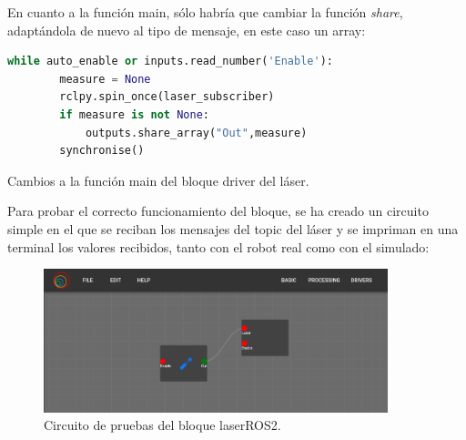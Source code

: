 \newpage

En cuanto a la función main, sólo habría que cambiar la función \textit{share}, adaptándola de nuevo al tipo de mensaje, en este caso un array:
\begin{code}[H]
  \begin{lstlisting}[language=python]
    while auto_enable or inputs.read_number('Enable'):
        measure = None
        rclpy.spin_once(laser_subscriber)
        if measure is not None:
            outputs.share_array("Out",measure)   
        synchronise()  
  \end{lstlisting}
  \caption[Cambios main bloque láser]{Cambios a la función main del bloque driver del láser.}
  \label{cod:laser_main_changes}
\end{code}

Para probar el correcto funcionamiento del bloque, se ha creado un circuito simple en el que se reciban los mensajes del topic del láser y se impriman
en una terminal los valores recibidos, tanto con el robot real como con el simulado:

\begin{figure} [H]
  \begin{center}
      \includegraphics[width=10cm]{figs/c4/laserC.png}
  \end{center}
  \caption[Circuito pruebas bloque láser ROS2]{Circuito de pruebas del bloque laserROS2.}
  \label{fig:laser_circuit}
\end{figure}

